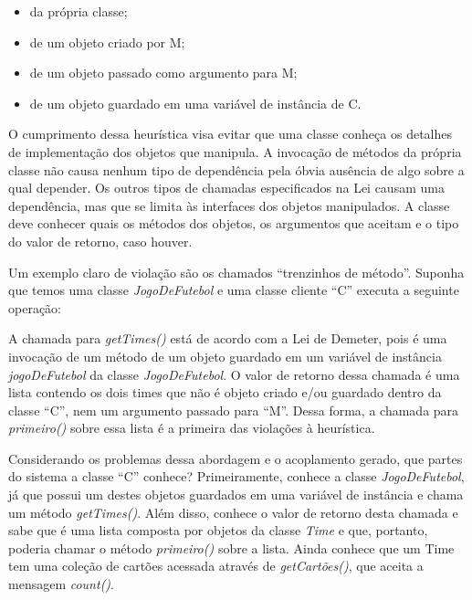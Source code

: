 \begin{itemize}
	\item da própria classe;
	\item de um objeto criado por M;
	\item de um objeto passado como argumento para M;
	\item de um objeto guardado em uma variável de instância de C.
\end{itemize}

O cumprimento dessa heurística visa evitar que uma classe conheça os detalhes de implementação dos objetos que
manipula. A invocação de métodos da própria classe não causa nenhum tipo de dependência pela óbvia ausência de algo 
sobre a qual depender. Os outros tipos de chamadas especificados na Lei causam uma dependência, mas que se limita às 
interfaces dos objetos manipulados. A classe deve conhecer quais os métodos dos objetos, os argumentos que aceitam e o 
tipo do valor de retorno, caso houver.
	
Um exemplo claro de violação são os chamados ``trenzinhos de método''. Suponha que temos uma classe \textit{JogoDeFutebol} e uma classe 
cliente ``C'' executa a seguinte operação:
	


A chamada para \textit{getTimes()} está de acordo com a Lei de Demeter, pois é uma invocação de um método de um objeto guardado em um 
variável de instância \textit{jogoDeFutebol} da classe \textit{JogoDeFutebol}. O valor de retorno dessa chamada é uma lista contendo 
os dois times que não é objeto criado e/ou guardado dentro da classe ``C'', nem um argumento passado para ``M''. Dessa forma, a 
chamada para \textit{primeiro()} sobre essa lista é a primeira das violações à heurística.
	
Considerando os problemas dessa abordagem e o acoplamento gerado, que partes do sistema a classe ``C'' conhece? Primeiramente, 
conhece a classe \textit{JogoDeFutebol}, já que possui um destes objetos guardados em uma variável de instância e chama um método 
\textit{getTimes()}. Além disso, conhece o valor de retorno desta chamada e sabe que é uma lista composta por objetos da classe 
\textit{Time} e que, portanto, poderia chamar o método \textit{primeiro()} sobre a lista. Ainda conhece que um Time tem uma coleção 
de cartões acessada através de \textit{getCartões()}, que aceita a mensagem \textit{count()}.
	

